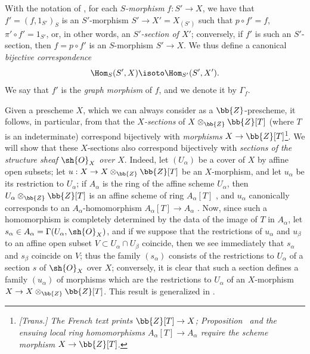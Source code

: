 \begin{env}[3.3.14]
\label{I.3.3.14}
With the notation of , for each \emph{$S$-morphism}
$f:S'\to X$, we have that $f'=(f,1_{S'})_S$ is an $S'$-morphism $S'\to X'=X_{(S')}$ such that
$p\circ f'=f$, $\pi'\circ f'=1_{S'}$, or, in other words, an
\emph{$S'$-section of $X'$}; conversely, if $f'$ is such an $S'$-section, then
$f=p\circ f'$ is an
$S$-morphism $S'\to X$. We thus define a canonical
\emph{bijective correspondence}
\[
  \Hom_S(S',X)\isoto\Hom_{S'}(S',X').
\]
We say that $f'$ is the \emph{graph morphism} of $f$, and we denote it by
$\Gamma_f$.
\end{env}

\begin{env}[3.3.15]
\label{I.3.3.15}
Given a prescheme $X$, which we can always consider as a $\bb{Z}$-prescheme,
it follows, in particular, from  that the \emph{$X$-sections} of
$X\otimes_\bb{Z}\bb{Z}[T]$ (where $T$ is an indeterminate)
correspond bijectively with \emph{morphisms} $X\to\bb{Z}[T]$\footnote{\emph{[Trans.]
The French text prints $\bb{Z}[T]\to X$; Proposition~ and the
ensuing local ring homomorphisms $A_\alpha[T]\to A_\alpha$ require the scheme
morphism $X\to\bb{Z}[T]$.}}. We will show that these
$X$-sections also correspond bijectively with \emph{sections of the structure
sheaf $\sh{O}_X$ over $X$}. Indeed, let $(U_\alpha)$ be a cover of $X$ by
affine open subsets; let $u:X\to X\otimes_\bb{Z}\bb{Z}[T]$ be an $X$-morphism, and let
$u_\alpha$ be its restriction to $U_\alpha$; if $A_\alpha$ is the ring of the
affine scheme $U_\alpha$, then $U_\alpha\otimes_\bb{Z}\bb{Z}[T]$ is an affine
scheme of ring $A_\alpha[T]$ , and $u_\alpha$ canonically
corresponds to an $A_\alpha$-homomorphism $A_\alpha[T]\to A_\alpha$
. Now, since such a homomorphism is completely determined by the
data of the image of $T$ in $A_\alpha$, let
$s_\alpha\in A_\alpha=\Gamma(U_\alpha,\sh{O}_X)$, and if we suppose that the
restrictions of $u_\alpha$ and $u_\beta$ to an affine open subset
$V\subset U_\alpha\cap U_\beta$ coincide, then we see immediately that
$s_\alpha$ and $s_\beta$ coincide on $V$; thus the family $(s_\alpha)$ consists
of the restrictions to $U_\alpha$ of a section $s$ of $\sh{O}_X$ over $X$;
conversely, it is clear that such a section defines a family $(u_\alpha)$ of
morphisms which are the restrictions to $U_\alpha$ of an $X$-morphism
$X\to X\otimes_\bb{Z}\bb{Z}[T]$. This result is generalized in
.
\end{env}


